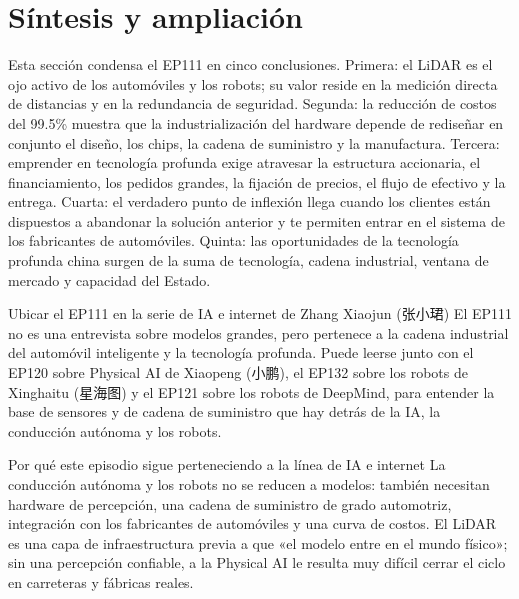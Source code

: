\section{Síntesis y ampliación}

Esta sección condensa el EP111 en cinco conclusiones. Primera: el LiDAR es el ojo activo de los automóviles y los robots; su valor reside en la medición directa de distancias y en la redundancia de seguridad. Segunda: la reducción de costos del 99.5\% muestra que la industrialización del hardware depende de rediseñar en conjunto el diseño, los chips, la cadena de suministro y la manufactura. Tercera: emprender en tecnología profunda exige atravesar la estructura accionaria, el financiamiento, los pedidos grandes, la fijación de precios, el flujo de efectivo y la entrega. Cuarta: el verdadero punto de inflexión llega cuando los clientes están dispuestos a abandonar la solución anterior y te permiten entrar en el sistema de los fabricantes de automóviles. Quinta: las oportunidades de la tecnología profunda china surgen de la suma de tecnología, cadena industrial, ventana de mercado y capacidad del Estado.

\begin{importantbox}{Ubicar el EP111 en la serie de IA e internet de Zhang Xiaojun (张小珺)}
El EP111 no es una entrevista sobre modelos grandes, pero pertenece a la cadena industrial del automóvil inteligente y la tecnología profunda. Puede leerse junto con el EP120 sobre Physical AI de Xiaopeng (小鹏), el EP132 sobre los robots de Xinghaitu (星海图) y el EP121 sobre los robots de DeepMind, para entender la base de sensores y de cadena de suministro que hay detrás de la IA, la conducción autónoma y los robots.
\end{importantbox}

\begin{knowledgebox}{Por qué este episodio sigue perteneciendo a la línea de IA e internet}
La conducción autónoma y los robots no se reducen a modelos: también necesitan hardware de percepción, una cadena de suministro de grado automotriz, integración con los fabricantes de automóviles y una curva de costos. El LiDAR es una capa de infraestructura previa a que «el modelo entre en el mundo físico»; sin una percepción confiable, a la Physical AI le resulta muy difícil cerrar el ciclo en carreteras y fábricas reales.
\end{knowledgebox}

